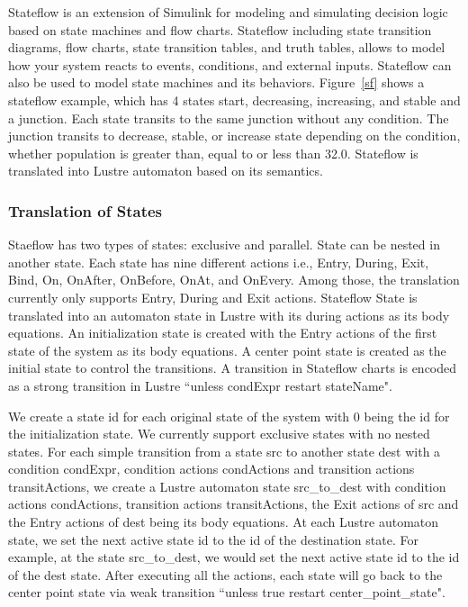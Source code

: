 \documentclass{article}
\begin{document}
Stateflow is an extension of Simulink for modeling and simulating decision logic based on state machines and flow charts. 
Stateflow including state transition diagrams, flow charts, state transition tables, and truth tables, allows to model how your system reacts to events, conditions, and external inputs.
Stateflow can also be used to model state machines and its behaviors. 
Figure~\ref{sf} shows a stateflow example, which has 4 states start, decreasing, increasing, and stable and a junction. 
Each state transits to the same junction without any condition. 
The junction transits to decrease, stable, or increase state depending on the condition, whether \textsf{population} is greater than, equal to or less than 32.0. 
Stateflow is translated into Lustre automaton based on its semantics. 

\subsubsection{Translation of States}
Staeflow has two types of states: exclusive and parallel. 
State can be nested in another state.
Each state has nine different actions i.e., Entry, During, Exit, Bind, On, OnAfter, OnBefore, OnAt, and OnEvery. 
Among those, the translation currently only supports Entry, During and Exit actions. 
Stateflow State is translated into an automaton state in Lustre with its during actions as its body equations.
An initialization state is created with the Entry actions of the first state of the system as its body equations. 
A center point state is created as the initial state to control the transitions. 
A transition in Stateflow charts is encoded as a strong transition in Lustre ``\textsf{unless} condExpr \textsf{restart} stateName".

We create a state id for each original state of the system with 0 being the id for the initialization state.
We currently support exclusive states with no nested states.
For each simple transition from a state \textsf{src} to another state \textsf{dest} with a condition \textsf{condExpr}, condition actions \textsf{condActions} and transition actions \textsf{transitActions}, we create a Lustre automaton state  \textsf{src\_to\_dest} with condition actions \textsf{condActions}, transition actions \textsf{transitActions}, the Exit actions of \textsf{src} and the Entry actions of \textsf{dest} being its body equations.
At each Lustre automaton state, we set the next active state id to the id of the destination state.
For example, at the state \textsf{src\_to\_dest}, we would set the next active state id to the id of the \textsf{dest} state.
After executing all the actions, each state will go back to the center point state via weak transition ``\textsf{unless} true \textsf{restart} center\_point\_state".
\end{document}
